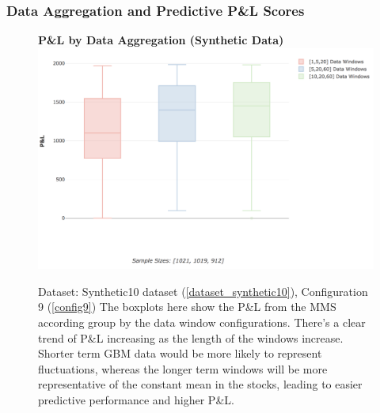 \documentclass[a4paper,11pt,oneside]{article}
\theoremstyle{plain}
\theoremstyle{definition}
\begin{document}
\subsubsection{Data Aggregation and Predictive P\&L Scores}\label{results_data_pl}

\begin{figure}[H]
	\centering 
	\textbf{P\&L by Data Aggregation (Synthetic Data)}
	\includegraphics[scale=0.4]{images/results/data/test_aggregation_pl.png}
	\caption[P\&L by Data Aggregation (Synthetic Data)]{
		Dataset: Synthetic10 dataset (\ref{dataset_synthetic10}), Configuration 9 (\ref{config9})
		\newline  The boxplots here show the P\&L from the MMS according group by the data window configurations. There's a clear trend of P\&L increasing as the length of the windows increase. Shorter term GBM data would be more likely to represent fluctuations, whereas the longer term windows will be more representative of the constant mean in the stocks, leading to easier predictive performance and higher P\&L.}
	\label{figure-test_aggregation_pl}
\end{figure}
\end{document}
